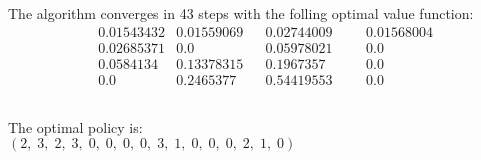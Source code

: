\documentclass[11pt,a4paper]{article}
\begin{document}
\subsection{}

The algorithm converges in 43 steps with the folling optimal value function:\\

\begin{align*}
    &0.01543432 &0.01559069 &&0.02744009 &&&0.01568004    \\
    &0.02685371 &0.0        &&0.05978021 &&&0.0           \\
    &0.0584134  &0.13378315 &&0.1967357  &&&0.0           \\
    &0.0        &0.2465377  &&0.54419553 &&&0.0        
\end{align*}

\subsection{}

The optimal policy is:\\

$(2,\; 3,\; 2,\; 3,\; 0,\; 0,\; 0,\; 0,\; 3,\; 1,\; 0,\; 0,\; 0,\; 2,\; 1,\; 0)$
\end{document}
